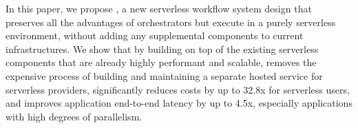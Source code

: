 In this paper, we propose \name{}, a new serverless workflow system design
that preserves all the advantages of orchestrators but execute in a purely
serverless environment, without adding any supplemental components to current
infrastructures. We show that by building on top of the existing serverless
components that are already highly performant and scalable, \name{} removes
the expensive process of building and maintaining a separate hosted service
for serverless providers, significantly reduces costs by up to 32.8x for
serverless users, and improves application end-to-end latency by up to 4.5x,
especially applications with high degrees of parallelism.







